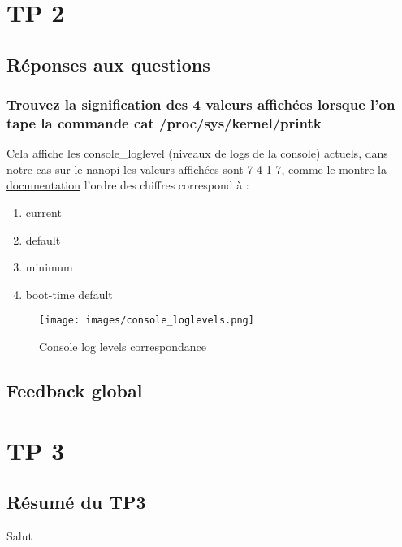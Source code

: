 \documentclass{ReportTemplate}
\begin{document}
\chapter{TP 2}
\section{Réponses aux questions}
\subsection{Trouvez la signification des 4 valeurs affichées lorsque l’on tape la commande cat /proc/sys/kernel/printk}
Cela affiche les console\_loglevel (niveaux de logs de la console) actuels, dans notre cas sur le nanopi les valeurs affichées sont 7 4 1 7, comme le montre la \href{https://www.kernel.org/doc/html/latest/core-api/printk-basics.html}{documentation} l'ordre des chiffres correspond à :
\begin{enumerate}
    \item current
    \item default
    \item minimum
    \item boot-time default
\end{enumerate}

\begin{figure}[H]
    \centering
    \texttt{[image: images/console\_loglevels.png]}
    \caption{Console log levels correspondance}
    \label{fig:LogLevels}
\end{figure}

\section{Feedback global}

\chapter{TP 3}
\section{Résumé du TP3}
Salut
\end{document}
